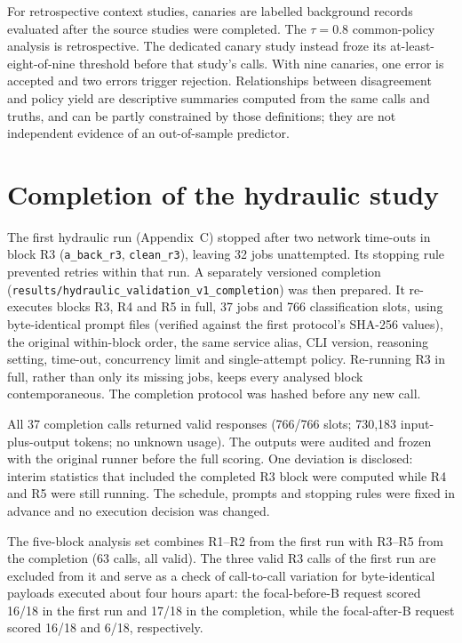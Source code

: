 \documentclass[11pt,a4paper]{article}
\begin{document}
For retrospective context studies, canaries are labelled background records evaluated after the source studies were completed. The $\tau=0.8$ common-policy analysis is retrospective. The dedicated canary study instead froze its at-least-eight-of-nine threshold before that study's calls. With nine canaries, one error is accepted and two errors trigger rejection. Relationships between disagreement and policy yield are descriptive summaries computed from the same calls and truths, and can be partly constrained by those definitions; they are not independent evidence of an out-of-sample predictor.



\FloatBarrier
\section{Completion of the hydraulic study}\label{app:hydraulic_completion}
The first hydraulic run (Appendix~C) stopped after two network time-outs in block R3 (\texttt{a\_back\_r3}, \texttt{clean\_r3}), leaving 32 jobs unattempted. Its stopping rule prevented retries within that run. A separately versioned completion (\nolinkurl{results/hydraulic_validation_v1_completion}) was then prepared. It re-executes blocks R3, R4 and R5 in full, 37 jobs and 766 classification slots, using byte-identical prompt files (verified against the first protocol's SHA-256 values), the original within-block order, the same service alias, CLI version, reasoning setting, time-out, concurrency limit and single-attempt policy. Re-running R3 in full, rather than only its missing jobs, keeps every analysed block contemporaneous. The completion protocol was hashed before any new call.

All 37 completion calls returned valid responses (766/766 slots; 730{,}183 input-plus-output tokens; no unknown usage). The outputs were audited and frozen with the original runner before the full scoring. One deviation is disclosed: interim statistics that included the completed R3 block were computed while R4 and R5 were still running. The schedule, prompts and stopping rules were fixed in advance and no execution decision was changed.

The five-block analysis set combines R1--R2 from the first run with R3--R5 from the completion (63 calls, all valid). The three valid R3 calls of the first run are excluded from it and serve as a check of call-to-call variation for byte-identical payloads executed about four hours apart: the focal-before-B request scored 16/18 in the first run and 17/18 in the completion, while the focal-after-B request scored 16/18 and 6/18, respectively.
\end{document}
